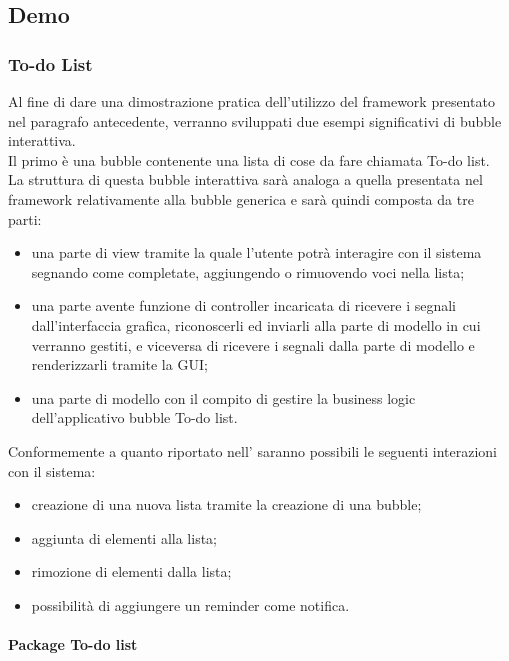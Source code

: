 \subsection{Demo}

\subsubsection{To-do List} \label{todo-list}
Al fine di dare una dimostrazione pratica dell'utilizzo del framework presentato nel paragrafo antecedente, verranno sviluppati due esempi significativi di bubble interattiva.\\
Il primo è una bubble contenente una lista di cose da fare chiamata To-do list.\\
La struttura di questa bubble interattiva sarà analoga a quella presentata nel framework relativamente alla bubble generica e sarà quindi composta da tre parti:
\begin{itemize}
	\item una parte di view tramite la quale l'utente potrà interagire con il sistema segnando come completate, aggiungendo o rimuovendo voci nella lista;
	\item una parte avente funzione di controller incaricata di ricevere i segnali dall'interfaccia grafica, riconoscerli ed inviarli alla parte di modello in cui verranno gestiti, e viceversa di ricevere i segnali dalla parte di modello e renderizzarli tramite la GUI;
	\item una parte di modello con il compito di gestire la business logic dell'applicativo bubble To-do list.
\end{itemize}
Conformemente a quanto riportato nell'\AnalisiDeiRequisiti{} saranno possibili le seguenti interazioni con il sistema:
\begin{itemize}
	\item creazione di una nuova lista tramite la creazione di una bubble;
	\item aggiunta di elementi alla lista;
	\item rimozione di elementi dalla lista;
	\item possibilità di aggiungere un reminder come notifica.
\end{itemize}

\paragraph{Package To-do list}\mbox{}\\

